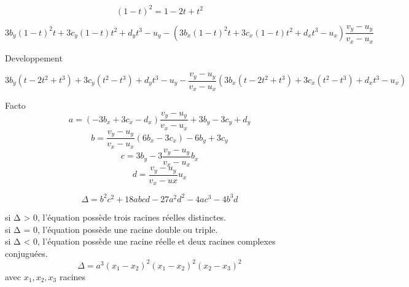 \newpage
 
 $$(1-t)^2 =  1 -2t +t^2$$
 
 $$3b_y (1-t)^2t + 3c_y (1-t)t^2 +d_yt^3 - u_y - (3b_x(1-t)^2t + 3c_x(1-t)t^2 + d_x t^3 - u_x) \frac{v_y - u_y}{v_x - u_x}$$
 
 Developpement
 
 $$3b_y (t - 2t^2 +  t^3) + 3c_y (t^2- t^3)+ d_y t^3 - u_y - \frac{v_y - u_y}{v_x - u_x} (3b_x(t -2t^2 +t^3) + 3c_x (t^2-t^3)+ d_x t^3 - u_x)$$
 
 Facto
 $$a = (-3b_x + 3c_x - d_x)\frac{v_y - u_y}{v_x - u_x} + 3b_y - 3c_y + d_y$$
$$b = \frac{v_y - u_y}{v_x - u_x}(6b_x - 3c_x) - 6 b_y +3c_y  $$
$$ c = 3b_y - 3\frac{v_y - u_y}{v_x - u_x}b_x$$
$$ d = \frac{v_y-u_y}{v_x-ux} u_x$$


$$\Delta = b^2c^2 + 18abcd - 27a^2d^2 - 4ac^3 - 4b^3d$$

    si Δ > 0, l'équation possède trois racines réelles distinctes.\\
    si Δ = 0, l'équation possède une racine double ou triple.\\
    si Δ < 0, l'équation possède une racine réelle et deux racines complexes conjuguées.\\

$$\Delta = a^3(x_1 - x_2)^2 (x_1 - x_2)^2 (x_2 - x_3)^2$$ avec $x_1, x_2, x_3$ racines